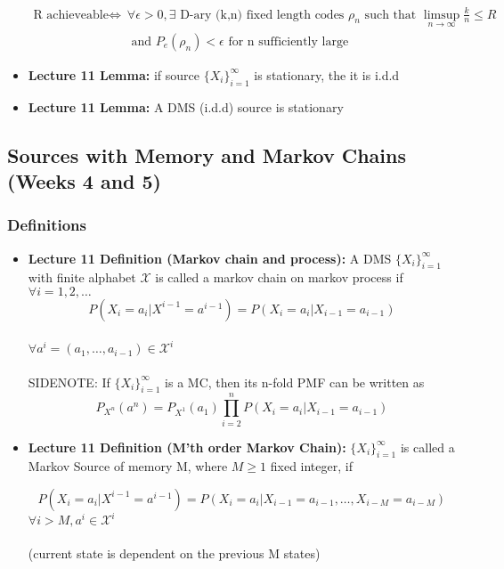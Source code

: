 \documentclass{article}
\begin{document}
\begin{itemize}
    \begin{align*}
        \text{R achieveable} \Longleftrightarrow & \forall \epsilon>0, \exists \text{ D-ary (k,n) fixed length codes } \rho_n \text{ such that } \limsup_{n \to\infty}\frac{k}{n}\leq R \\
         & \text{ and } P_e(\rho_n)<\epsilon \text{ for n sufficiently large}
    \end{align*}

    \item \textbf{Lecture 11 Lemma:} if source \(\{X_i\}_{i=1}^\infty\) is stationary, the it is i.d.d
    \item \textbf{Lecture 11 Lemma:} A DMS (i.d.d) source is stationary
\end{itemize}
\subsection{Sources with Memory and Markov Chains (Weeks 4 and 5)}
\subsubsection{Definitions}
\begin{itemize}
    \item \textbf{Lecture 11 Definition (Markov chain and process):} A DMS \(\{X_i\}_{i=1}^\infty\) with finite alphabet \(\mathcal{X}\) is called a markov chain on markov process if \(\forall i = 1, 2, \ldots\)
    \[P(X_i=a_i | X^{i-1} = a^{i-1}) = P(X_i = a_i | X_{i-1} = a_{i-1})\]
    \\ \(\forall a^i = (a_1, \ldots, a_{i-1}) \in \mathcal{X}^i\)
    \\ \\
    SIDENOTE: If \(\{X_i\}_{i=1}^\infty\) is a MC, then its n-fold PMF can be written as \\
    \[P_{X^n}(a^n) = P_{X^1}(a_1) \prod_{i=2}^n P(X_i=a_i|X_{i-1}=a_{i-1})\]
    
    \item \textbf{Lecture 11 Definition (M'th order Markov Chain):} \(\{X_i\}_{i=1}^\infty\) is called a Markov Source of memory M, where \(M\geq 1\) fixed integer, if
    
    \[P(X_i=a_i|X^{i-1} = a^{i-1}) =P(X_i=a_i|X_{i-1} = a_{i-1}, \ldots, X_{i-M} = a_{i-M})\]
    \(\forall i>M, a^i \in \mathcal{X}^i\)
    \\ \\ (current state is dependent on the previous M states)

    
\end{itemize}
\end{document}
